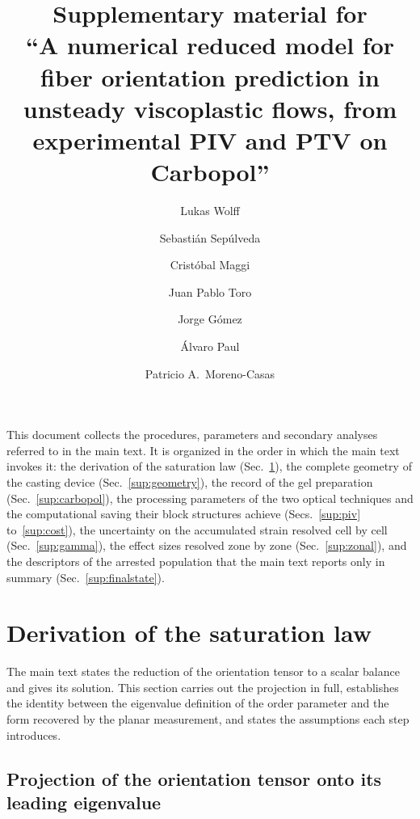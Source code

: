 \documentclass[%
  aip,
  pof,
  reprint,
  floatfix
]{revtex4-2}
\begin{document}
\title{Supplementary material for\\
``A numerical reduced model for fiber orientation prediction in unsteady viscoplastic flows, from experimental PIV and PTV on Carbopol''}

\author{Lukas Wolff}
\author{Sebasti\'an Sep\'ulveda}
\author{Crist\'obal Maggi}
\author{Juan Pablo Toro}
\author{Jorge G\'omez}
\author{\'Alvaro Paul}
\author{Patricio A.\ Moreno-Casas}

\maketitle

\noindent
This document collects the procedures, parameters and secondary analyses referred to in the main text. It is organized in the order in which the main text invokes it: the derivation of the saturation law (Sec.~\ref{sup:derivation}), the complete geometry of the casting device (Sec.~\ref{sup:geometry}), the record of the gel preparation (Sec.~\ref{sup:carbopol}), the processing parameters of the two optical techniques and the computational saving their block structures achieve (Secs.~\ref{sup:piv} to~\ref{sup:cost}), the uncertainty on the accumulated strain resolved cell by cell (Sec.~\ref{sup:gamma}), the effect sizes resolved zone by zone (Sec.~\ref{sup:zonal}), and the descriptors of the arrested population that the main text reports only in summary (Sec.~\ref{sup:finalstate}).


\section{Derivation of the saturation law}
\label{sup:derivation}

The main text states the reduction of the orientation tensor to a scalar balance and gives its solution. This section carries out the projection in full, establishes the identity between the eigenvalue definition of the order parameter and the form recovered by the planar measurement, and states the assumptions each step introduces.

\subsection{Projection of the orientation tensor onto its leading eigenvalue}
\end{document}
